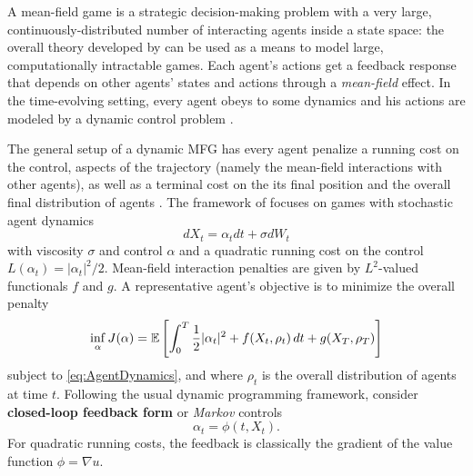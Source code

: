 \documentclass[../report.tex]{subfiles}
\begin{document}
A mean-field game \cite{LASRY2006619,LASRY2006679} is a strategic decision-making problem with a very large, continuously-distributed number of interacting agents inside a state space: the overall theory developed by \citeauthor{LASRY2006619} can be used as a means to model large, computationally intractable games. Each agent's actions get a feedback response that depends on other agents' states and actions through a \textit{mean-field} effect. In the time-evolving setting, every agent obeys to some dynamics and his actions are modeled by a dynamic control problem \cite{LASRY2006679}.

The general setup of a dynamic MFG has every agent penalize a running cost on the control, aspects of the trajectory (namely the mean-field interactions with other agents), as well as a terminal cost on the its final position and the overall final distribution of agents \cite{LASRY2006679}.
The framework of \cites{benamou:hal-01295299}{benamou2018entropy} focuses on games with stochastic agent dynamics 
\begin{equation}\label{eq:AgentDynamics}
dX_t = \alpha_tdt + \sigma dW_t
\end{equation}
with viscosity $\sigma$ and control $\alpha$ and a quadratic running cost on the control $L(\alpha_t) = |\alpha_t|^2/2$. Mean-field interaction penalties are given by $L^2$-valued functionals $f$ and $g$. A representative agent's objective is to minimize the overall penalty
\begin{equation}\label{eq:ControlObjective}
	\inf_{\alpha} J(\alpha) = \mathbb{E}\left[
	\int_0^T \frac{1}{2}|\alpha_t|^2 + f(X_t, \rho_t) \,dt + g(X_T, \rho_T)
	\right]
\end{equation}
subject to \cref{eq:AgentDynamics}, and where $\rho_t$ is the overall distribution of agents at time $t$. Following the usual dynamic programming framework, \textcite{LASRY2006679} consider \textbf{closed-loop feedback form} or \textit{Markov} controls
\begin{equation}
	\alpha_t = \phi(t, X_t).
\end{equation}
For quadratic running costs, the feedback is classically the gradient of the value function $\phi = \nabla u$.
\end{document}
